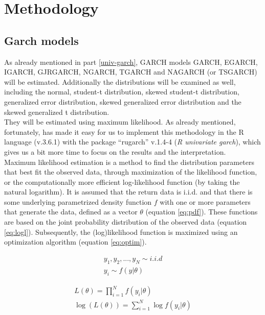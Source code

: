 \documentclass[a4paper, twoside]{templates/ociamthesis}
\begin{document}
\clearpage

\hypertarget{methodology}{%
\section{Methodology}\label{methodology}}

\hypertarget{garch-models}{%
\subsection{Garch models}\label{garch-models}}

\noindent As already mentioned in part \ref{univ-garch}, GARCH models GARCH, EGARCH, IGARCH, GJRGARCH, NGARCH, TGARCH and NAGARCH (or TSGARCH) will be estimated. Additionally the distributions will be examined as well, including the normal, student-t distribution, skewed student-t distribution, generalized error distribution, skewed generalized error distribution and the skewed generalized t distribution. ~\\

\noindent They will be estimated using maximum likelihood. As already mentioned, fortunately, \textcite{alexios2020} has made it easy for us to implement this methodology in the R language (v.3.6.1) with the package ``rugarch'' v.1.4-4 (\emph{R univariate garch}), which gives us a bit more time to focus on the results and the interpretation.~\\

\noindent Maximum likelihood estimation is a method to find the distribution parameters that best fit the observed data, through maximization of the likelihood function, or the computationally more efficient log-likelihood function (by taking the natural logarithm). It is assumed that the return data is i.i.d. and that there is some underlying parametrized density function \(f\) with one or more parameters that generate the data, defined as a vector \(\theta\) (equation \eqref{eq:pdf}). These functions are based on the joint probability distribution of the observed data (equation \eqref{eq:logl}). Subsequently, the (log)likelihood function is maximized using an optimization algorithm (equation \eqref{eq:optim}).

\begin{align} 
  y_1,y_2,...,y_N \sim i.i.d
    \\
  y_i \sim f(y|\theta)
 \label{eq:pdf}
\end{align}

\begin{align} 
 L(\theta) = \prod^N_{i=1}f(y_i|\theta)
  \\
 \log(L(\theta)) = \sum^N_{i=1} \log f(y_i |\theta)
 \label{eq:logl}
\end{align}
\end{document}
